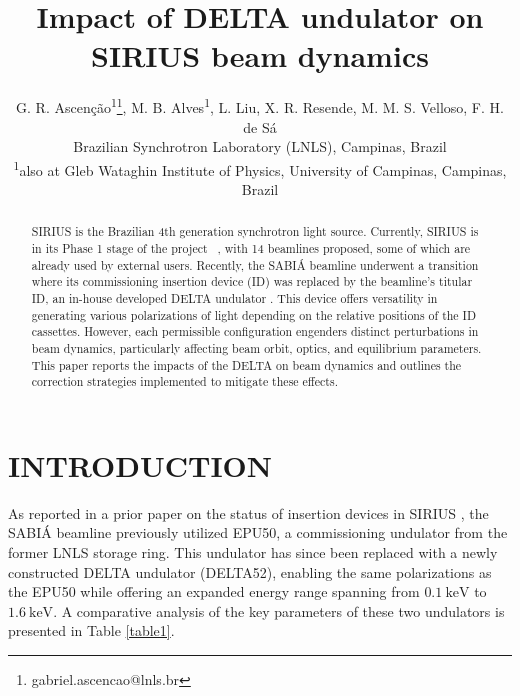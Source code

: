 \documentclass[a4paper,
               keeplastbox,   %
               ]{jacow}
\begin{document}
\title{Impact of DELTA undulator on SIRIUS beam dynamics }

\author{G. R. Ascenção\textsuperscript{1}\thanks{gabriel.ascencao@lnls.br}, M. B. Alves\textsuperscript{1}, L. Liu, X. R. Resende, M. M. S. Velloso, F. H. de Sá\\ Brazilian Synchrotron Laboratory (LNLS), Campinas, Brazil \\
\textsuperscript{1}also at Gleb Wataghin Institute of Physics, University of Campinas, Campinas, Brazil
}

	
\maketitle
%
\begin{abstract}
SIRIUS is the Brazilian 4th generation synchrotron light source. Currently, SIRIUS is in its Phase 1 stage of the project ~\cite{Liu:IPAC23-WEOGA2, Beamlines}, with 14 beamlines proposed, some of which are already used by external users. Recently, the SABIÁ beamline underwent a transition where its commissioning insertion device (ID) was replaced by the beamline's titular ID, an in-house developed DELTA undulator  \cite{Vilela:IPAC17-WEPIK053, Vilela:IPAC18-TUPMK003}. This device offers versatility in generating various polarizations of light depending on the relative positions of the ID cassettes. However,  each permissible configuration engenders distinct perturbations in beam dynamics, particularly affecting beam orbit, optics, and equilibrium parameters. This paper reports the impacts of the DELTA on beam dynamics and outlines the correction strategies implemented to mitigate these effects.
\end{abstract}


\section{INTRODUCTION}
As reported in a prior paper on the status of insertion devices in SIRIUS \cite{Ascenção:IPAC23-MOPM088}, the SABIÁ beamline previously utilized EPU50, a commissioning undulator from the former LNLS storage ring. This undulator has since been replaced with a newly constructed DELTA undulator (DELTA52), enabling the same polarizations as the EPU50 while offering an expanded energy range spanning from $\SI{0.1}{\kilo\electronvolt}$ to $\SI{1.6}{\kilo\electronvolt}$. A comparative analysis of the key parameters of these two undulators is presented in Table \ref{table1}.
\end{document}
